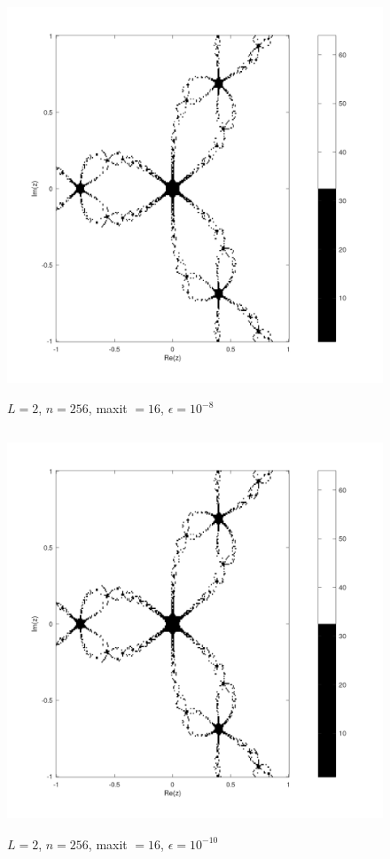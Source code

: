 \documentclass{article} %
\begin{document}
\begin{figure}[H]
    \centering
    \includegraphics[width=152mm, height=120mm]{images/L2n256maxit16e10-8.png}
    \caption{$L=2$, $n=256$, maxit $=16$, $\epsilon=10^{-8}$}
\end{figure}

\begin{figure}[H]
    \centering
    \includegraphics[width=152mm, height=120mm]{images/L2n256maxit16e10-10.png}
    \caption{$L=2$, $n=256$, maxit $=16$, $\epsilon=10^{-10}$}
\end{figure}
\end{document}
